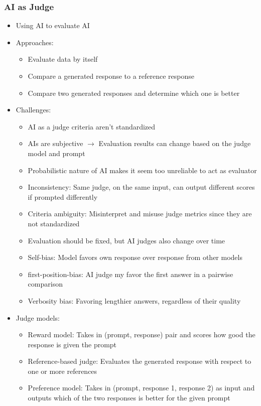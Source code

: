 \documentclass[11pt]{scrartcl}
\begin{document}
\subsubsection*{AI as Judge}
\begin{itemize}
	\item Using AI to evaluate AI
	\item Approaches:
	\begin{itemize}
		\item Evaluate data by itself
		\item Compare a generated response to a reference response
		\item Compare two generated responses and determine which one is better
	\end{itemize}
	\item Challenges:
	\begin{itemize}
		\item AI as a judge criteria aren't standardized
		\item AIs are subjective $\to$ Evaluation results can change based on the judge model and prompt
		\item Probabilistic nature of AI makes it seem too unreliable to act as evaluator
		\item Inconsistency: Same judge, on the same input, can output different scores if prompted differently
		\item Criteria ambiguity: Misinterpret and misuse judge metrics since they are not standardized
		\item Evaluation should be fixed, but AI judges also change over time
		\item Self-bias: Model favors own response over response from other models
		\item first-position-bias: AI judge my favor the first answer in a pairwise comparison
		\item Verbosity bias: Favoring lengthier answers, regardless of their quality
	\end{itemize}
	\item Judge models:
	\begin{itemize}
		\item Reward model: Takes in (prompt, response) pair and scores how good the response is given the prompt
		\item Reference-based judge: Evaluates the generated response with respect to one or more references
		\item Preference model: Takes in (prompt, response 1, response 2) as input and outputs which of the two responses is better for the given prompt
	\end{itemize}
\end{itemize}
\end{document}
